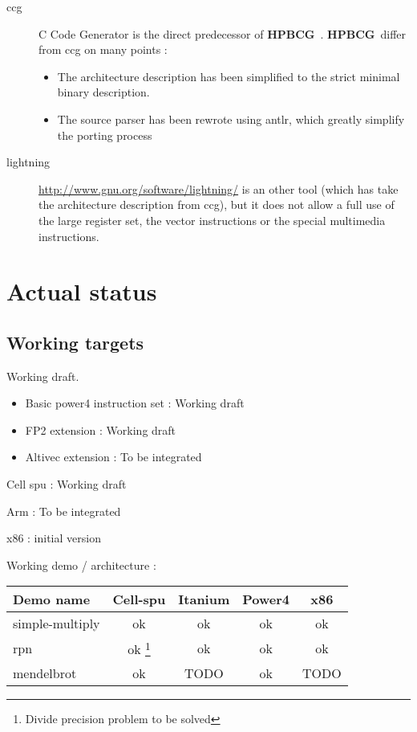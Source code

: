 \documentclass{article}
\newcommand{\hpbcg}{\textbf{HPBCG}\ }
\begin{document}
\begin{description}
\item[ccg] C Code Generator \cite{2001Piumarta} is the direct
  predecessor of \hpbcg. \hpbcg differ from ccg on many points :
  \begin{itemize}
  \item The architecture description has been simplified to the strict
    minimal binary description.
  \item The source parser has been rewrote using antlr, which greatly
    simplify the porting process
  \end{itemize}
\item[lightning] \url{http://www.gnu.org/software/lightning/} is an
  other tool (which has take the architecture description from ccg),
  but it does not allow a full use of the large register set, the
  vector instructions or the special multimedia instructions.
\end{description}

\section{Actual status}

\subsection{Working targets}

\begin{description}
\item[Itanium]  Working draft.
\item[Power4]  
  \begin{itemize}
    \item Basic power4 instruction set : Working draft
    \item FP2 extension : Working draft
    \item Altivec extension : To be integrated
  \end{itemize}
\item Cell spu : Working draft 
\item Arm : To be integrated
\item x86 : initial version
\end{description}

Working demo / architecture :

\begin{tabular}{|l | c c c c|} \hline
  Demo name       & Cell-spu & Itanium  & Power4 & x86\\ \hline
  simple-multiply & ok       & ok       & ok  & ok\\ \hline
  rpn             & ok \footnote{Divide precision problem to be  solved} & ok  & ok& ok \\ \hline
  mendelbrot      & ok       & TODO  & ok  & TODO\\ \hline
\end{tabular}
\end{document}
